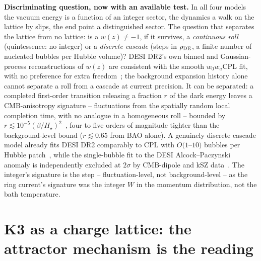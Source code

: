 \documentclass[11pt,a4paper]{article}
\begin{document}
\begin{keybox}
\textbf{Discriminating question, now with an available test.} In all four models the vacuum energy is a function
of an integer sector, the dynamics a walk on the lattice by slips, the end point a distinguished sector. The
question that separates the lattice from no lattice: is a $w(z)\neq-1$, if it survives, a \emph{continuous roll}
(quintessence: no integer) or a \emph{discrete cascade} (steps in $\rho_{\rm DE}$, a finite number of nucleated
bubbles per Hubble volume)? DESI DR2's own binned and Gaussian-process reconstructions of $w(z)$ are consistent
with the smooth $w_0w_a$CPL fit, with no preference for extra freedom~\cite{DESI2025DR2,Lodha2025}; the
background expansion history alone cannot separate a roll from a cascade at current precision. It can be
separated: a completed first-order transition releasing a fraction $r$ of the dark energy leaves a
CMB-anisotropy signature -- fluctuations from the spatially random local completion time, with no analogue in a
homogeneous roll -- bounded by $r\lesssim10^{-5}(\beta/H_\star)^2$~\cite{KorenTsaiWang2025}, four to five orders
of magnitude tighter than the background-level bound ($r\lesssim0.65$ from BAO alone). A genuinely discrete
cascade model already fits DESI DR2 comparably to CPL with $O(1$--$10)$ bubbles per Hubble
patch~\cite{BaiLuOrlofsky2026}, while the single-bubble fit to the DESI Alcock--Paczynski anomaly is independently
excluded at $2\sigma$ by CMB-dipole and kSZ data~\cite{FriedmanShawJohnsonMack2026}. The integer's signature is
the step -- fluctuation-level, not background-level -- as the ring current's signature was the integer $W$ in the
momentum distribution, not the bath temperature.
\end{keybox}

\section{K3 as a charge lattice: the attractor mechanism is the reading}
\end{document}
